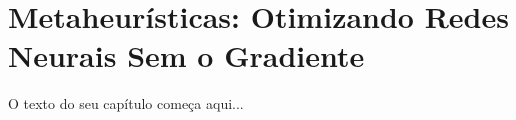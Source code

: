 
\chapter{Metaheurísticas: Otimizando Redes Neurais Sem o Gradiente}
\label{cap:otimizacao-metaheuristicas}

O texto do seu capítulo começa aqui...